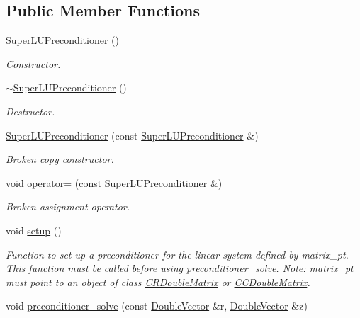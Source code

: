 \subsection*{Public Member Functions}
\begin{DoxyCompactItemize}
\item 
\hyperlink{classoomph_1_1SuperLUPreconditioner_a60f0201dc7d7b4ca3aedcc07faf33d13}{Super\+L\+U\+Preconditioner} ()
\begin{DoxyCompactList}\small\item\em Constructor. \end{DoxyCompactList}\item 
\hyperlink{classoomph_1_1SuperLUPreconditioner_a7a821938d3889f18d8d0050c34bc8d99}{$\sim$\+Super\+L\+U\+Preconditioner} ()
\begin{DoxyCompactList}\small\item\em Destructor. \end{DoxyCompactList}\item 
\hyperlink{classoomph_1_1SuperLUPreconditioner_a580996fae2ff79cc2a2fae1fd0b748d9}{Super\+L\+U\+Preconditioner} (const \hyperlink{classoomph_1_1SuperLUPreconditioner}{Super\+L\+U\+Preconditioner} \&)
\begin{DoxyCompactList}\small\item\em Broken copy constructor. \end{DoxyCompactList}\item 
void \hyperlink{classoomph_1_1SuperLUPreconditioner_a3adff07af5fd101787ee1721a65f9a7c}{operator=} (const \hyperlink{classoomph_1_1SuperLUPreconditioner}{Super\+L\+U\+Preconditioner} \&)
\begin{DoxyCompactList}\small\item\em Broken assignment operator. \end{DoxyCompactList}\item 
void \hyperlink{classoomph_1_1SuperLUPreconditioner_a7a53307202af7c06a2a6b336e943b1b4}{setup} ()
\begin{DoxyCompactList}\small\item\em Function to set up a preconditioner for the linear system defined by matrix\+\_\+pt. This function must be called before using preconditioner\+\_\+solve. Note\+: matrix\+\_\+pt must point to an object of class \hyperlink{classoomph_1_1CRDoubleMatrix}{C\+R\+Double\+Matrix} or \hyperlink{classoomph_1_1CCDoubleMatrix}{C\+C\+Double\+Matrix}. \end{DoxyCompactList}\item 
void \hyperlink{classoomph_1_1SuperLUPreconditioner_a687a7578834939a5ca70bd4871189ad0}{preconditioner\+\_\+solve} (const \hyperlink{classoomph_1_1DoubleVector}{Double\+Vector} \&r, \hyperlink{classoomph_1_1DoubleVector}{Double\+Vector} \&z)

\end{DoxyCompactItemize}
